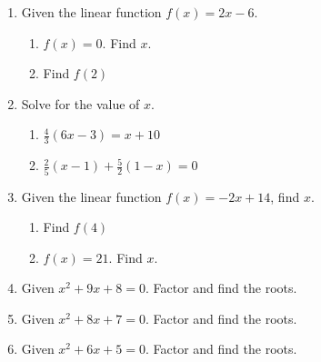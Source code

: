 \begin{enumerate}
\item Given the linear function $f(x)=2x-6$.
\begin{multicols}{2}
  \begin{enumerate}
    \item   $f(x)=0$. Find $x$. \vspace{6cm}
    \item Find $f(2)$ \vspace{6cm}
  \end{enumerate}
\end{multicols}
  \vspace{6cm}

\item Solve for the value of $x$.
  \begin{multicols}{2}
    \begin{enumerate}
      \item   $\frac{4}{3}(6x-3)=x + 10$
      \item   $\frac{2}{5}(x-1)+\frac{5}{2}(1-x)=0$
    \end{enumerate}
  \end{multicols}
  \vspace{6cm}

\item Given the linear function $f(x)=-2x+14$, find $x$.
\begin{multicols}{2}
  \begin{enumerate}
    \item Find $f(4)$
    \item   $f(x)=21$. Find $x$.
  \end{enumerate}
\end{multicols} \vspace{4cm}

\item Given $x^2+9x+8=0$. Factor and find the roots. \vspace{3cm} 

\item Given $x^2+8x+7=0$. Factor and find the roots. \vspace{4cm}

\item Given $x^2+6x+5=0$. Factor and find the roots. %

\end{enumerate}
